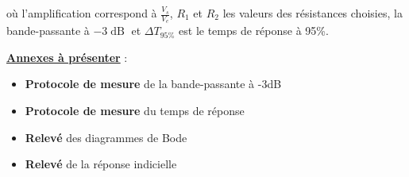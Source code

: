 où l'amplification correspond à $\frac{V_s}{V_e}$, $R_1$ et $R_2$ les valeurs des résistances choisies, la bande-passante à $-3\operatorname{dB}$ et $\Delta{}T_{95\%}$ est le temps de réponse à 95\%.
 
\medskip

\noindent
\underline{\textbf{Annexes à présenter}} : 

\begin{itemize}[label=$\square$]
	\item \textbf{Protocole de mesure} de la bande-passante à -3dB
	\item \textbf{Protocole de mesure} du temps de réponse
	\item \textbf{Relevé} des diagrammes de Bode 
	\item \textbf{Relevé} de la réponse indicielle
\end{itemize}
 
\medskip

\noindent
\begin{minipage}{0.23\linewidth}
\end{minipage}
\hfill
\begin{minipage}{0.23\linewidth}
\end{minipage}
\hfill
\begin{minipage}{0.23\linewidth}
\end{minipage}
\hfill
\begin{minipage}{0.23\linewidth}
\end{minipage}




